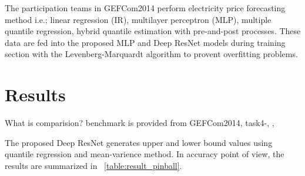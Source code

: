 \documentclass[review]{elsarticle}
\begin{document}
    The participation teams in GEFCom2014 perform electricity price forecasting method i.e.; linear regression (IR)\cite{Dudek2016}, multilayer perceptron (MLP)\cite{Dudek2016},  multiple quantile regression\cite{Juban2016}, hybrid quantile estimation with pre-and-post processes\cite{Maciejowska2016}.
    These data are fed into the proposed MLP and Deep ResNet models during training section with the Levenberg-Marquardt algorithm to provent overfitting problems.

\section{Results}
  What is comparision? benchmark is provided from GEFCom2014, task4-\cite{Dudek2016}, \cite{Maciejowska2016}, \cite{Khosravi2011}

  The proposed Deep ResNet generates upper and lower bound values using quantile regression and mean-varience method.
  In accuracy point of view, the results are summarized in ~\ref{table:result_pinball}.
\end{document}
